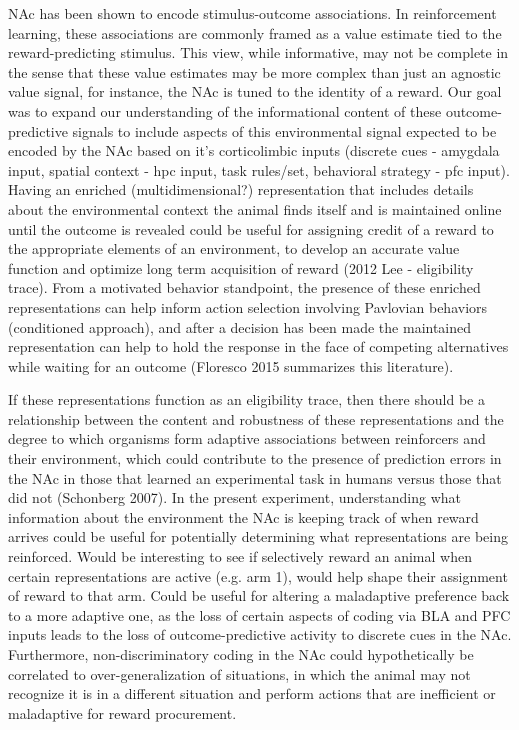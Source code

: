 \documentclass[11pt]{article}
\begin{document}
{NAc has been shown to encode stimulus-outcome associations. In reinforcement
learning, these associations are commonly framed as a value estimate tied to the
reward-predicting stimulus. This view, while informative, may not be complete in
the sense that these value estimates may be more complex than just an agnostic
value signal, for instance, the NAc is tuned to the identity of a reward. Our
goal was to expand our understanding of the informational content of these
outcome-predictive signals to include aspects of this environmental signal
expected to be encoded by the NAc based on it’s corticolimbic inputs (discrete
cues - amygdala input, spatial context - hpc input, task rules/set, behavioral
strategy - pfc input). Having an enriched (multidimensional?) representation
that includes details about the environmental context the animal finds itself
and is maintained online until the outcome is revealed could be useful for
assigning credit of a reward to the appropriate elements of an environment, to
develop an accurate value function and optimize long term acquisition of reward
(2012 Lee - eligibility trace). From a motivated behavior standpoint, the
presence of these enriched representations can help inform action selection
involving Pavlovian behaviors (conditioned approach), and after a decision has
been made the maintained representation can help to hold the response in the
face of competing alternatives while waiting for an outcome (Floresco 2015
summarizes this literature).

If these representations function as an eligibility trace, then there should be
a relationship between the content and robustness of these representations and
the degree to which organisms form adaptive associations between reinforcers and
their environment, which could contribute to the presence of prediction errors
in the NAc in those that learned an experimental task in humans versus those
that did not (Schonberg 2007). In the present experiment, understanding what
information about the environment the NAc is keeping track of when reward
arrives could be useful for potentially determining what representations are
being reinforced. Would be interesting to see if selectively reward an animal
when certain representations are active (e.g. arm 1), would help shape their
assignment of reward to that arm. Could be useful for altering a maladaptive
preference back to a more adaptive one, as the loss of certain aspects of coding
via BLA and PFC inputs leads to the loss of outcome-predictive activity to
discrete cues in the NAc. Furthermore, non-discriminatory coding in the NAc
could hypothetically be correlated to over-generalization of situations, in
which the animal may not recognize it is in a different situation and perform
actions that are inefficient or maladaptive for reward procurement.

}
\end{document}
